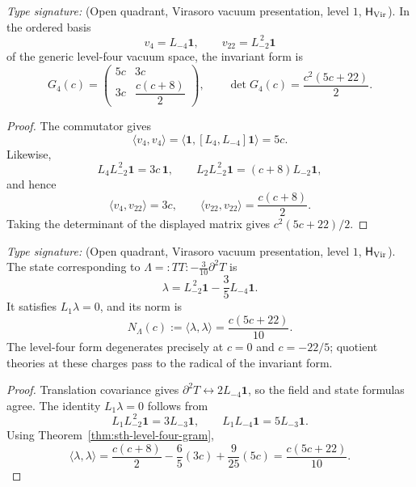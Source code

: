 \begin{theorem}
\ClaimStatusProvedHere
\label{thm:sth-level-four-gram}
\emph{Type signature:}
\textup{(Open quadrant, Virasoro vacuum presentation, level \(1\),
\(\mathsf H_{\mathrm{Vir}}\)).}
In the ordered basis
\[
  v_4=L_{-4}\mathbf1,\qquad
  v_{22}=L_{-2}^{\,2}\mathbf1
\]
of the generic level-four vacuum space, the invariant form is
\begin{equation}
 G_4(c)=
 \begin{pmatrix}
   5c & 3c\\[2pt]
   3c & \dfrac{c(c+8)}{2}
 \end{pmatrix},
 \qquad
 \det G_4(c)=\frac{c^2(5c+22)}{2}.
 \label{eq:sth-level-four-gram}
\end{equation}
\end{theorem}

\begin{proof}
The commutator gives
\[
 \langle v_4,v_4\rangle
 =\langle\mathbf1,[L_4,L_{-4}]\mathbf1\rangle=5c.
\]
Likewise,
\[
 L_4L_{-2}^{\,2}\mathbf1=3c\,\mathbf1,
 \qquad
 L_2L_{-2}^{\,2}\mathbf1=(c+8)L_{-2}\mathbf1,
\]
and hence
\[
 \langle v_4,v_{22}\rangle=3c,\qquad
 \langle v_{22},v_{22}\rangle=\frac{c(c+8)}2.
\]
Taking the determinant of the displayed matrix gives
$c^2(5c+22)/2$.
\end{proof}

\begin{corollary}
\ClaimStatusProvedHere
\label{cor:sth-lambda-norm}
\emph{Type signature:}
\textup{(Open quadrant, Virasoro vacuum presentation, level \(1\),
\(\mathsf H_{\mathrm{Vir}}\)).}
The state corresponding to
$\Lambda={:}TT{:}-\frac{3}{10}\partial^2T$ is
\[
  \lambda=L_{-2}^{\,2}\mathbf1-\frac35L_{-4}\mathbf1.
\]
It satisfies $L_1\lambda=0$, and its norm is
\begin{equation}
  N_\Lambda(c):=\langle\lambda,\lambda\rangle
  =\frac{c(5c+22)}{10}.
  \label{eq:sth-lambda-norm}
\end{equation}
The level-four form degenerates precisely at
$c=0$ and $c=-22/5$; quotient theories at these charges pass to the
radical of the invariant form.
\end{corollary}

\begin{proof}
Translation covariance gives
$\partial^2T\leftrightarrow2L_{-4}\mathbf1$, so the field and state
formulas agree.  The identity $L_1\lambda=0$ follows from
\[
 L_1L_{-2}^{\,2}\mathbf1=3L_{-3}\mathbf1,\qquad
 L_1L_{-4}\mathbf1=5L_{-3}\mathbf1.
\]
Using Theorem~\ref{thm:sth-level-four-gram},
\[
 \langle\lambda,\lambda\rangle
 =\frac{c(c+8)}2-\frac65(3c)+\frac9{25}(5c)
 =\frac{c(5c+22)}{10}.
\]
\end{proof}

